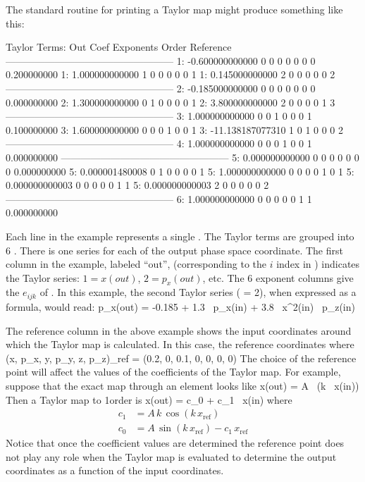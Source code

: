 The standard \bmad routine for printing a Taylor map might produce something 
like this: 
\begin{example}
   Taylor Terms:
    Out     Coef              Exponents           Order        Reference
   ---------------------------------------------------
      1:     -0.600000000000  0  0  0  0  0  0        0       0.200000000
      1:      1.000000000000  1  0  0  0  0  0        1
      1:      0.145000000000  2  0  0  0  0  0        2
   ---------------------------------------------------
      2:     -0.185000000000  0  0  0  0  0  0        0       0.000000000
      2:      1.300000000000  0  1  0  0  0  0        1
      2:      3.800000000000  2  0  0  0  0  1        3
   ---------------------------------------------------
      3:      1.000000000000  0  0  1  0  0  0        1       0.100000000
      3:      1.600000000000  0  0  0  1  0  0        1
      3:    -11.138187077310  1  0  1  0  0  0        2
   ---------------------------------------------------
      4:      1.000000000000  0  0  0  1  0  0        1       0.000000000
   ---------------------------------------------------
      5:      0.000000000000  0  0  0  0  0  0        0       0.000000000
      5:      0.000001480008  0  1  0  0  0  0        1
      5:      1.000000000000  0  0  0  0  1  0        1
      5:      0.000000000003  0  0  0  0  0  1        1
      5:      0.000000000003  2  0  0  0  0  0        2
   ---------------------------------------------------
      6:      1.000000000000  0  0  0  0  0  1        1       0.000000000
\end{example}
Each line in the example represents a single . The
Taylor terms are grouped into 6 . There is one
series for each of the output phase space coordinate. The first
column in the example, labeled ``out'', (corresponding to the $i$
index in ) indicates the Taylor series: $1 = x(out)$, $2 =
p_x(out)$, etc. The 6 exponent columns give the $e_{ijk}$ of
. In this example, the second Taylor series ( = 2),
when expressed as a formula, would read:
\Begineq
  p_x(out) = -0.185 + 1.3 \, p_x(in) + 3.8 \, x^2(in) \, p_z(in)
\Endeq

The reference column in the above example shows the input coordinates around
which the Taylor map is calculated. In this case, the reference
coordinates where 
\Begineq
  (x, p_x, y, p_y, z, p_z)_{ref} = (0.2, 0, 0.1, 0, 0, 0, 0)
\Endeq
The choice of the reference point will affect the values of the
coefficients of the Taylor map. For example, suppose that the exact
map through an element looks like
\Begineq
  x(out) = A \, \sin(k \, x(in))
\Endeq
Then a Taylor map to 1\St order is
\Begineq
  x(out) = c_0 + c_1 \, x(in)
\Endeq
where
\begin{align}
  c_1 &= A \, k \, \cos(k \, x_{\mbox{ref}}) \\
  c_0 &= A \, \sin(k \, x_{\mbox{ref}}) - c_1 \, x_{\mbox{ref}} \nonumber
\end{align}
Notice that once the coefficient values are determined the reference
point does not play any role when the Taylor map is evaluated to
determine the output coordinates as a function of the input
coordinates.

